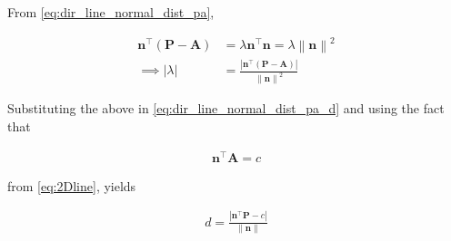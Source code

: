 \documentclass[12pt]{article}
\providecommand{\brak}[1]{\ensuremath{\left(#1\right)}}
\providecommand{\norm}[1]{\left\lVert#1\right\rVert}
\providecommand{\abs}[1]{\left\vert#1\right\vert}
\let\vec\mathbf
\begin{document}
\begin{enumerate}
\begin{enumerate}
From 
	\eqref{eq:dir_line_normal_dist_pa},

\begin{align}
	\vec{n}^{\top}
	\brak{\vec{P}- \vec{A}} &=  \lambda \vec{n}^{\top}\vec{n} = \lambda\norm{\vec{n}}^2
	\\
	\implies \abs{\lambda}&= \frac{\abs{\vec{n}^{\top}
	\brak{\vec{P}- \vec{A}}}}{\norm{\vec{n}}^2} 
\end{align}

Substituting the above in \eqref{eq:dir_line_normal_dist_pa_d} and using the fact that

\begin{align}
   \vec{n}^{\top}\vec{A} = c
\end{align}

from 	\eqref{eq:2Dline}, yields 

\begin{align}
	\label{eq:line_dist_2d}
	d = \frac{\abs{   \vec{n}^{\top}\vec{P}-c }}{\norm{\vec{n}}}	
\end{align}


\end{enumerate}
\end{enumerate}
\end{document}
